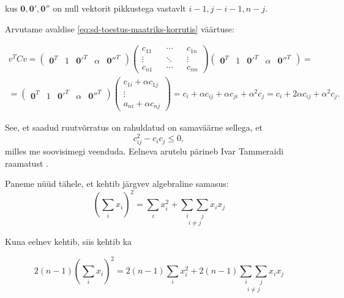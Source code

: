 \documentclass[a4paper,12pt]{article}
\numberwithin{equation}{section}
\theoremstyle{definition}
\begin{document}
kus $\mathbf{0},\mathbf{0'},\mathbf{0''}$ on null vektorit pikkustega vastavlt $i-1,j-i-1, n -j$.



Arvutame avaldise \ref{eq:sd-toestus-maatriks-korrutis} väärtuse:

\begin{equation*}
\begin{split}
v^{T}Cv =
\begin{pmatrix}
\mathbf{0}^T & 1 & \mathbf{0'}^T & \alpha & \mathbf{0''}^T
\end{pmatrix}
\begin{pmatrix}
c_{11} && \cdots && c_{1n} \\
\vdots && \ddots && \vdots \\
c_{n1} && \cdots && c_{nn}  
\end{pmatrix}
\begin{pmatrix}
\mathbf{0}^T & 1 & \mathbf{0'}^T & \alpha & \mathbf{0''}^T
\end{pmatrix} = \\
= \begin{pmatrix}
\mathbf{0}^T & 1 & \mathbf{0'}^T & \alpha & \mathbf{0''}^T
\end{pmatrix}
\begin{pmatrix}
c_{1i} + \alpha c_{1j} \\
\vdots \\
a_{ni} + \alpha c_{nj} 
\end{pmatrix}
= c_{i} + \alpha c_{ij} + \alpha c_{ji} + \alpha^2 c_{j} = c_i + 2 \alpha c_{ij} + \alpha^2 c_{j}.
\end{split}
\end{equation*}


See, et saadud ruutvõrratus on rahuldatud on samaväärne sellega, et 
\begin{equation*}
c_{ij}^2 - c_{i}c_{j} \leq 0,
\end{equation*}
milles me soovisimegi veenduda. Eelneva arutelu pärineb Ivar Tammeraidi raamatust \cite{Tammeraid1999}.  

Paneme n\"u\"ud tähele, et kehtib järgvev algebraline samasus:  
\begin{equation*}
\left( \sum_i x_i \right)^2 =   \sum_i x_i^2 + \underset{i \neq j}{\sum_i \sum_j} x_i x_j
\end{equation*}

Kuna eelnev kehtib, siis kehtib ka 

\begin{equation*}
2 \left( n-1 \right) \left( \sum_i x_i \right)^2 =  2 \left( n-1 \right) \sum_i x_i^2 + 2 \left( n-1 \right) \underset{i \neq j}{\sum_i \sum_j} x_i x_j
\end{equation*}
\end{document}
